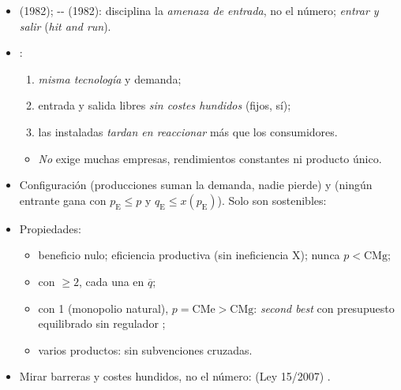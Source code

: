 \documentclass{article}
\begin{document}
\begin{columnas}
\begin{itemize}
\item {} (1982); -- (1982): disciplina la \emph{amenaza de entrada}, no el número; \emph{entrar y salir} (\emph{hit and run}).
\end{itemize}
\begin{itemize}
\item {}:
  \begin{enumerate}
  \item \emph{misma tecnología} y demanda;
  \item entrada y salida libres \emph{sin costes hundidos} (fijos, sí);
  \item las instaladas \emph{tardan en reaccionar} más que los consumidores.
  \end{enumerate}
  \begin{itemize}
  \item \emph{No} exige muchas empresas, rendimientos constantes ni producto único.
  \end{itemize}
\item Configuración  (producciones suman la demanda, nadie pierde) y  (ningún entrante gana con $p_{\mathrm E}\leq p$ y $q_{\mathrm E}\leq x(p_{\mathrm E})$). Solo son sostenibles:
\item Propiedades:
  \begin{itemize}
  \item beneficio nulo; eficiencia productiva (sin ineficiencia X); nunca $p<\mathrm{CMg}$;
  \item con $\geq2$, cada una en $\overline{q}$;
  \item con 1 (monopolio natural), $p=\mathrm{CMe}>\mathrm{CMg}$: \emph{second best} con presupuesto equilibrado sin regulador ;
  \item varios productos: sin subvenciones cruzadas.
  \end{itemize}
\end{itemize}
\begin{itemize}
\item Mirar barreras y costes hundidos, no el número:  (Ley 15/2007) .

\end{itemize}
\end{columnas}
\end{document}
